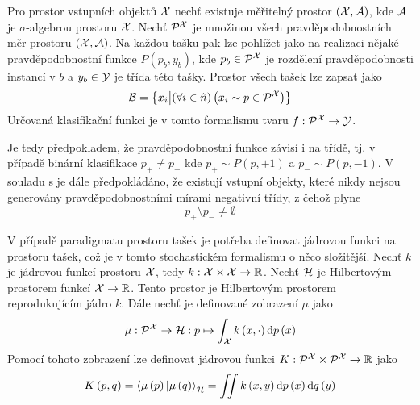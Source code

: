 Pro prostor vstupních objektů \( \mathcal X \) nechť existuje měřitelný prostor \( \left( \mathcal X, \mathcal A \right) \), kde \( \mathcal A \) je \( \sigma \)-algebrou prostoru \( \mathcal X \). Nechť \( \mathcal P^{\mathcal X} \) je množinou všech pravděpodobnostních měr prostoru \( \left( \mathcal X, \mathcal A \right) \). Na každou tašku pak lze pohlížet jako na realizaci nějaké pravděpodobnostní funkce \( P \left( p_b, y_b \right) \), kde \( p_b \in \mathcal P^{\mathcal X} \) je rozdělení pravděpodobnosti instancí v \( b \) a \( y_b \in \mathcal Y \) je třída této tašky. Prostor všech tašek lze zapsat jako
\[ \mathcal B = \left\{ x_i \middle| \left( \forall i \in \hat n \right) \left( x_i \sim p \in \mathcal P^{\mathcal X} \right) \right\} \]
Určovaná klasifikační funkci je v tomto formalismu tvaru \( f : \mathcal P^{\mathcal X} \to \mathcal Y \).

Je tedy předpokladem, že pravděpodobnostní funkce závisí i na třídě, tj. v případě binární klasifikace \( p_+ \neq p_- \) kde \( p_+ \sim P(p, +1) \) a \( p_- \sim P(p, -1) \). V souladu s \cite{dietterich_solving_1997} je dále předpokládáno, že existují vstupní objekty, které nikdy nejsou generovány pravděpodobnostními mírami negativní třídy, z čehož plyne
\[ p_+ \setminus p_- \neq \emptyset \]

V případě paradigmatu prostoru tašek je potřeba definovat jádrovou funkci na prostoru tašek, což je v tomto stochastickém formalismu o něco složitější. Nechť \( k \) je jádrovou funkcí prostoru \( \mathcal X \), tedy \( k : \mathcal X \times \mathcal X \to \mathbb R \). Nechť \( \mathcal H \) je Hilbertovým prostorem funkcí \( \mathcal X \to \mathbb R \). Tento prostor je Hilbertovým prostorem reprodukujícím jádro \( k \). Dále nechť je definované zobrazení \( \mu \) jako
\[ \mu : \mathcal P^{\mathcal X} \to \mathcal H : p \mapsto \int_{\mathcal X} k \left( x, \cdot \right) \mathrm{d}p \left( x \right) \]
Pomocí tohoto zobrazení lze definovat jádrovou funkci \( K : \mathcal P^{\mathcal X} \times \mathcal P^{\mathcal X} \to \mathbb R \) jako
\[ K \left( p, q \right) = \braket{\mu \left( p \right) | \mu \left( q \right)}_{\mathcal H} = \iint k \left( x, y \right) \mathrm{d} p \left( x \right) \mathrm{d} q \left( y \right) \]

